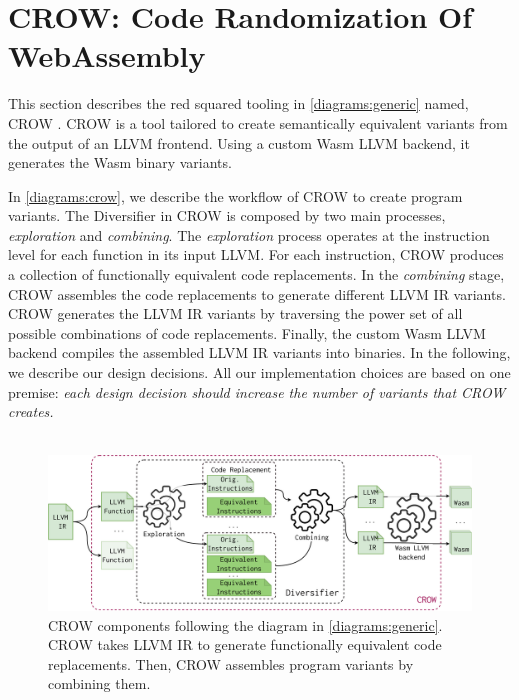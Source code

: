 
\section{CROW: Code Randomization Of WebAssembly}
\label{section:crow}

This section describes the red squared tooling in \autoref{diagrams:generic} named, CROW  \cite{CROW}. CROW is a tool tailored to create semantically equivalent \wasm variants from the output of an LLVM frontend.
Using a custom Wasm LLVM backend, it generates the Wasm binary variants.

In \autoref{diagrams:crow}, we describe the workflow of CROW to create program variants.
The Diversifier in CROW is composed by two main processes, \textit{exploration} and \textit{combining}. 
The \emph{exploration} process operates at the instruction level for each function in its input LLVM.
For each instruction, CROW produces a collection of functionally equivalent code replacements.  
In the \emph{combining} stage, CROW assembles the code replacements to generate different LLVM IR variants.
CROW generates the LLVM IR variants by traversing the power set of all possible combinations of code replacements.
Finally, the custom Wasm LLVM backend compiles the assembled LLVM IR variants into \wasm binaries.
In the following, we describe our design decisions. All our implementation choices are based on one premise: \emph{each design decision should increase the number of \wasm variants that CROW creates.}
\\
\\

\begin{figure}[h]
    \includegraphics[width=\linewidth]{diagrams/generation/crow.drawio.pdf}
    \caption{CROW components following the diagram in \autoref{diagrams:generic}. CROW takes LLVM IR to generate functionally equivalent code replacements. Then, CROW assembles program variants by combining them.}
    \label{diagrams:crow}
\end{figure}


